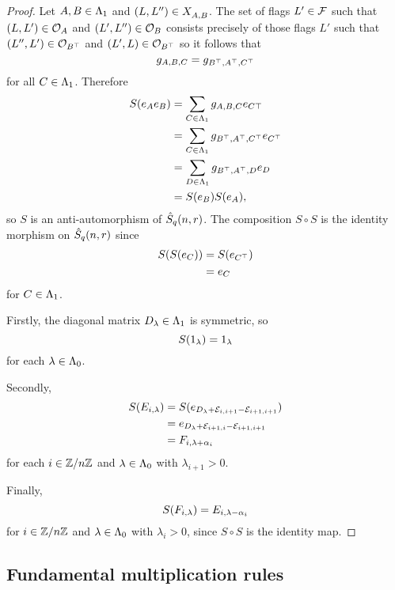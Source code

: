 \documentclass[a4paper, 11pt, twoside]{report}
\begin{document}
\begin{proof}
Let $A,B\in\Lambda_1{}$ and $(L,L'')\in X_{A,B}^{}$. The set of flags $L'\in\mathcal{F}$ such that $(L,L')\in\mathcal{O}_{A}$ and $(L',L'')\in\mathcal{O}_{B}$ consists precisely of those flags $L'$ such that $(L'',L')\in\mathcal{O}_{B^\top}$ and $(L',L)\in\mathcal{O}_{B^\top}$ so it follows that
\begin{equation*}
g_{A,B,C} = g_{B^\top, A^\top, C^\top}
\end{equation*}
for all $C\in\Lambda_1{}$. Therefore
\begin{align*}
S{(e_A e_B)}
&= \sum_{C\in\Lambda_1{}} g_{A,B,C}e_{C\top}\\
&= \sum_{C\in\Lambda_1{}} g_{B^\top,A^\top,C^\top}e_{C^\top}\\
&= \sum_{D\in\Lambda_1{}} g_{B^\top,A^\top,D}e_D\\
&= S{(e_B)}S{(e_A)},
\end{align*}
so $S$ is an anti-automorphism of $\hat{S}_q(n,r)$. The composition $S\circ S$ is the identity morphism on $\hat{S}_q(n,r)$ since
\begin{align*}
S{(S{(e_C)})}
&= S{(e_{C^\top})}\\
&= e_C
\end{align*}
for $C\in\Lambda_1{}$.

Firstly, the diagonal matrix $D_\lambda\in\Lambda_1{}$ is symmetric, so
\begin{equation*}
S{(1_\lambda)} = 1_\lambda
\end{equation*}
for each $\lambda\in\Lambda_0{}$.

Secondly,
\begin{align*}
S{(E_{i,\lambda})}
&= S{(e_{D_\lambda+\mathcal{E}_{i,i+1}-\mathcal{E}_{i+1,i+1}})}\\
&= e_{D_\lambda+\mathcal{E}_{i+1,i}-\mathcal{E}_{i+1,i+1}}\\
&= F_{i,\lambda+\alpha_i}
\end{align*}
for each $i\in\mathbb{Z}/{n \mathbb{Z}}$ and $\lambda\in\Lambda_0{}$ with $\lambda_{i+1}>0$.

Finally,
\begin{equation*}
S{(F_{i,\lambda})} = E_{i,\lambda -\alpha_i}
\end{equation*}
for $i\in\mathbb{Z}/{n \mathbb{Z}}$ and $\lambda\in\Lambda_0{}$ with $\lambda_i>0$, since $S\circ S$ is the identity map.
\end{proof}


\subsection{Fundamental multiplication rules}
\end{document}
